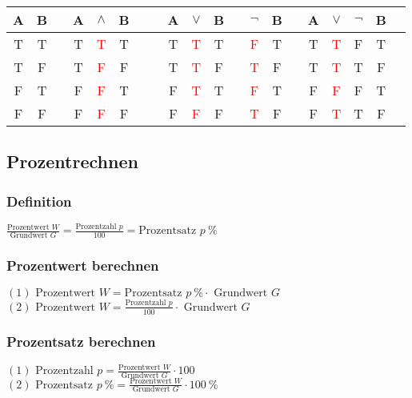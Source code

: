 \begin{multicols}{2}
    \begin{tabular}{@{ }c@{ }@{ }c | c@{ }@{ }c@{ }@{ }c@{ }@{ }c@{ }@{ }c | c@{ }@{ }c@{ }@{ }c@{ }@{ }c@{ }@{ }c | c@{ }@{ }c | c@{ }@{ }c@{ }@{ }c@{ }@{ }c@{ }@{ }c@{ }@{ }c}
        A & B &  & A & $\land$            & B &  &  & A & $\lor$             & B &  & $\lnot$            & B &  & A & $\lor$             & $\lnot$ & B & \\
        \hline
        T & T &  & T & \textcolor{red}{T} & T &  &  & T & \textcolor{red}{T} & T &  & \textcolor{red}{F} & T &  & T & \textcolor{red}{T} & F       & T & \\
        T & F &  & T & \textcolor{red}{F} & F &  &  & T & \textcolor{red}{T} & F &  & \textcolor{red}{T} & F &  & T & \textcolor{red}{T} & T       & F & \\
        F & T &  & F & \textcolor{red}{F} & T &  &  & F & \textcolor{red}{T} & T &  & \textcolor{red}{F} & T &  & F & \textcolor{red}{F} & F       & T & \\
        F & F &  & F & \textcolor{red}{F} & F &  &  & F & \textcolor{red}{F} & F &  & \textcolor{red}{T} & F &  & F & \textcolor{red}{T} & T       & F & \\
    \end{tabular}

    \subsection{Prozentrechnen}
    \vspace{-4mm}
    \subsubsection{Definition}
    \vspace{-4mm}
    $\frac{\text{Prozentwert } W}{\text{Grundwert } G} = \frac{\text{Prozentzahl } p}{100} = \text{Prozentsatz } p\ \%$
    \subsubsection{Prozentwert berechnen}
    \vspace{-4mm}
    $(1) \text{ Prozentwert } W = \text{Prozentsatz } p\ \% \cdot \text{ Grundwert } G$\\
    $(2) \text{ Prozentwert } W = \frac{\text{Prozentzahl } p}{100} \cdot \text{ Grundwert } G$
    \subsubsection{Prozentsatz berechnen}
    \vspace{-4mm}
    $(1) \text{ Prozentzahl } p = \frac{\text{Prozentwert } W}{\text{Grundwert } G} \cdot 100$\\
    $(2) \text{ Prozentsatz } p\ \% = \frac{\text{Prozentwert } W}{\text{Grundwert } G} \cdot 100\ \%$

\end{multicols}
